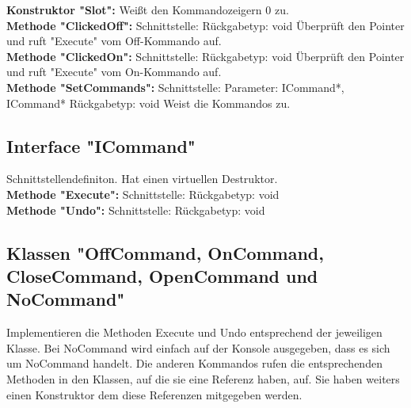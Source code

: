 \documentclass[12pt,a4paper]{article}
\begin{document}
\textbf {Konstruktor "Slot": } 
\newline
Weißt den Kommandozeigern 0 zu.
\\

\textbf {Methode "ClickedOff": } 
\newline
Schnittstelle:
\newline
Rückgabetyp: void
\newline
Überprüft den Pointer und ruft "Execute" vom Off-Kommando auf.
\\

\textbf {Methode "ClickedOn": } 
\newline
Schnittstelle:
\newline
Rückgabetyp: void
\newline
Überprüft den Pointer und ruft "Execute" vom On-Kommando auf.
\\

\textbf {Methode "SetCommands": } 
\newline
Schnittstelle:
\newline
Parameter: ICommand*, ICommand*
\newline
Rückgabetyp: void
\newline
Weist die Kommandos zu.
\\

\subsection {Interface "ICommand"}
Schnittstellendefiniton. Hat einen virtuellen Destruktor.
\\

\textbf {Methode "Execute": } 
\newline
Schnittstelle:
\newline
Rückgabetyp: void
\\

\textbf {Methode "Undo": } 
\newline
Schnittstelle:
\newline
Rückgabetyp: void
\\

\subsection {Klassen "OffCommand, OnCommand, CloseCommand, OpenCommand und NoCommand"}
Implementieren die Methoden Execute und Undo entsprechend der jeweiligen Klasse. Bei NoCommand wird einfach auf der Konsole ausgegeben, dass es sich um NoCommand handelt. Die anderen Kommandos rufen die entsprechenden Methoden in den Klassen, auf die sie eine Referenz haben, auf.
Sie haben weiters einen Konstruktor dem diese Referenzen mitgegeben werden.
\\
\end{document}
